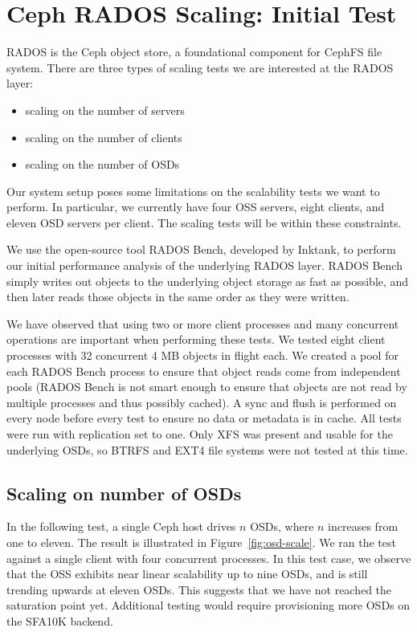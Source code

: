 \documentclass{article}
\begin{document}
\section{Ceph RADOS Scaling: Initial Test}

RADOS is the Ceph object store, a foundational component for CephFS file
system. There are three types of scaling tests we are interested at the RADOS layer:

\begin{itemize}
  \item scaling on the number of servers
  \item scaling on the number of clients
  \item scaling on the number of OSDs
\end{itemize}

Our system setup poses some limitations on the scalability tests we want to
perform. In particular, we currently have four OSS servers, eight clients, and eleven OSD servers
per client. The scaling tests will be within these constraints. 

We use the open-source tool RADOS Bench, developed by Inktank, to perform our
initial performance analysis of the underlying RADOS layer.  RADOS Bench simply
writes out objects to the underlying object storage as fast as possible, and
then later reads those objects in the same order as they were written.

We have observed that using two or more client processes and many concurrent
operations are important when performing these tests.  We tested eight client processes 
with 32 concurrent 4 MB objects in flight each. We created a pool for
each RADOS Bench process to ensure that object reads come from independent pools
(RADOS Bench is not smart enough to ensure that objects are not read by multiple
processes and thus possibly cached).  A sync and flush is performed on every
node before every test to ensure no data or metadata is in cache.  All tests
were run with replication set to one.  Only XFS was present
and usable for the underlying OSDs, so BTRFS and EXT4 file systems were not
tested at this time.


\subsection{Scaling on number of OSDs}

In the following test, a single Ceph host drives $n$ OSDs, where $n$
increases from one to eleven. The result is illustrated in Figure~\ref{fig:osd-scale}.
We ran the test against a single client with four concurrent processes. In this test
case, we observe that the OSS exhibits near linear scalability up to nine
OSDs, and is still trending upwards at eleven OSDs. This suggests that we have not reached the
saturation point yet. Additional testing would require provisioning more OSDs on the SFA10K backend.
\end{document}
